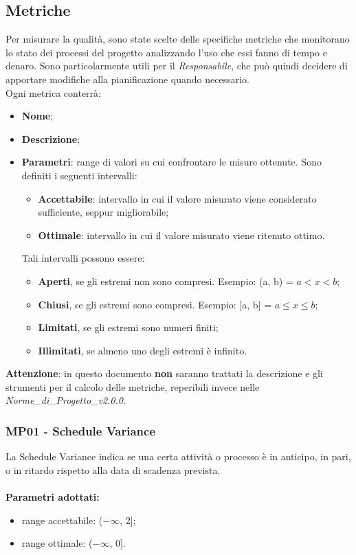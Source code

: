 \subsection{Metriche}
Per misurare la qualità, sono state scelte delle specifiche metriche che monitorano lo stato dei processi del progetto analizzando l'uso che essi fanno di tempo e denaro. Sono particolarmente utili per il \textit{Responsabile}, che può quindi decidere di apportare modifiche alla pianificazione quando necessario.\\
Ogni metrica conterrà:
\begin{itemize}
\item \textbf{Nome};
\item \textbf{Descrizione};
\item \textbf{Parametri}: range di valori su cui confrontare le misure ottenute. Sono definiti i seguenti intervalli: \begin{itemize}
\item \textbf{Accettabile}: intervallo in cui il valore misurato viene considerato sufficiente, seppur migliorabile;
\item \textbf{Ottimale}: intervallo in cui il valore misurato viene ritenuto ottimo.
\end{itemize}
Tali intervalli possono essere: \begin{itemize}
\item \textbf{Aperti}, se gli estremi non sono compresi. Esempio: (a, b) = $a < x < b$; 
\item \textbf{Chiusi}, se gli estremi sono compresi. Esempio: [a, b] = $a \leq x \leq b$;
\item \textbf{Limitati}, se gli estremi sono numeri finiti;
\item \textbf{Illimitati}, se almeno uno degli estremi è infinito.
\end{itemize}
\end{itemize}
\textbf{Attenzione}: in questo documento \textbf{non} saranno trattati la descrizione e gli strumenti per il calcolo delle metriche, reperibili invece nelle \textit{Norme\_di\_Progetto\_v2.0.0}.

\subsubsection{MP01 - Schedule Variance} 
La Schedule Variance indica se una certa attività o processo è in anticipo, in pari, o in ritardo rispetto alla data di scadenza prevista. \\ \\ 
\textbf{Parametri adottati:} 
\begin{itemize}
\item range accettabile: ($ -\infty $, 2];
\item range ottimale: ($ -\infty $, 0].
\end{itemize}


